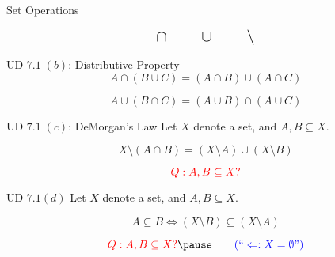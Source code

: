 \begin{frame}{}
  \centerline{\Large Set Operations}

  \[
    \text{\Large $\cap \qquad \cup \qquad \setminus$}
  \]
\end{frame}

\begin{frame}{}
  \begin{exampleblock}{UD $7.1 \;(b)$: Distributive Property}
    \[
      A \cap (B \cup C) = (A \cap B) \cup (A \cap C)
    \]
  \end{exampleblock}

  \pause
  \vspace{0.50cm}
  \begin{theorem}
    \[
      A \cup (B \cap C) = (A \cup B) \cap (A \cup C)
    \]

  \end{theorem}
\end{frame}

\begin{frame}{}
  \begin{exampleblock}{UD $7.1 \;(c)$: DeMorgan's Law}
    Let $X$ denote a set, and $A, B \subseteq X$.

    \[
      X \setminus (A \cap B) = (X \setminus A) \cup (X \setminus B)
    \]
  \end{exampleblock}

  \pause
  \vspace{0.50cm}
  \[
    \textcolor{red}{Q: A, B \subseteq X?}
  \]
\end{frame}

\begin{frame}{}
  \begin{exampleblock}{UD $7.1 (d)$}
    Let $X$ denote a set, and $A, B \subseteq X$.

    \[
      A \subseteq B \iff (X \setminus B) \subseteq (X \setminus A)
    \]
  \end{exampleblock}

  \pause
  \vspace{0.50cm}

  \pause
  \[
    \red{Q: A, B \subseteq X?} \pause \qquad \blue{(``\Leftarrow: X = \emptyset")}
  \]
\end{frame}

